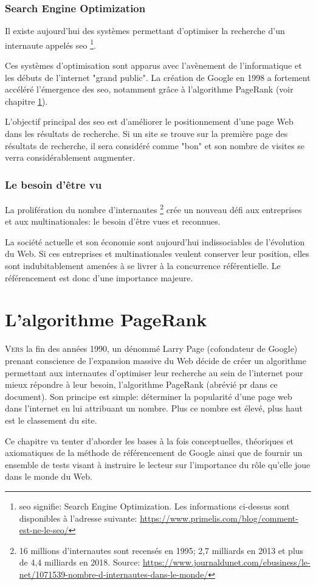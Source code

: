 \documentclass[12pt,twoside, openright]{memoir}
\begin{document}
	\subsection{Search Engine Optimization}
	Il existe aujourd'hui des systèmes permettant d'optimiser la recherche d'un internaute appelés \gls{seo} \footnote{\gls{seo} signifie: Search Engine Optimization. Les informations ci-dessus sont disponibles à l'adresse suivante: \url{https://www.primelis.com/blog/comment-est-ne-le-seo/}}.\par
	Ces systèmes d'optimisation sont apparus avec l'avènement de l'informatique et les débuts de l'internet "grand public". La création de Google en 1998 a fortement accéléré l'émergence des \gls{seo}, notamment grâce à l'algorithme PageRank (voir chapitre \ref{chap_pr}).\par
	L'objectif principal des \gls{seo} est d'améliorer le positionnement d'une page Web dans les résultats de recherche. Si un site se trouve sur la première page des résultats de recherche, il sera considéré comme "bon" et son nombre de visites se verra considérablement augmenter.
	\subsection{Le besoin d'être vu}
	La prolifération du nombre d'internautes \footnote{16 millions d'internautes sont recensés en 1995; 2,7 milliards en 2013 et plus de 4,4 milliards en 2018. Source: \url{https://www.journaldunet.com/ebusiness/le-net/1071539-nombre-d-internautes-dans-le-monde/}} crée un nouveau défi aux entreprises et aux multinationales: le besoin d'être vues et reconnues.\par
	La société actuelle et son économie sont aujourd'hui indissociables de l'évolution du Web. Si ces entreprises et multinationales veulent conserver leur position, elles sont indubitablement amenées à se livrer à la concurrence référentielle. Le référencement est donc d'une importance majeure.
	
	\chapter{L'algorithme PageRank}
	\label{chap_pr}
	\lettrine[lraise=0.1, nindent=0em]{V}{ers} la fin des années 1990, un dénommé Larry Page (cofondateur de Google) prenant conscience de l'expansion massive du Web décide de créer un algorithme permettant aux internautes d'optimiser leur recherche au sein de l'internet pour mieux répondre à leur besoin, l'algorithme PageRank (abrévié \gls{pr} dans ce document). Son principe est simple: déterminer la popularité d'une page web dans l'internet en lui attribuant un nombre. Plus ce nombre est élevé, plus haut est le classement du site. \cite{ref_wikipr}\par
	Ce chapitre va tenter d'aborder les bases à la fois conceptuelles, théoriques et axiomatiques de la méthode de référencement de Google ainsi que de fournir un ensemble de tests visant à instruire le lecteur sur l'importance du rôle qu'elle joue dans le monde du Web.
\end{document}
